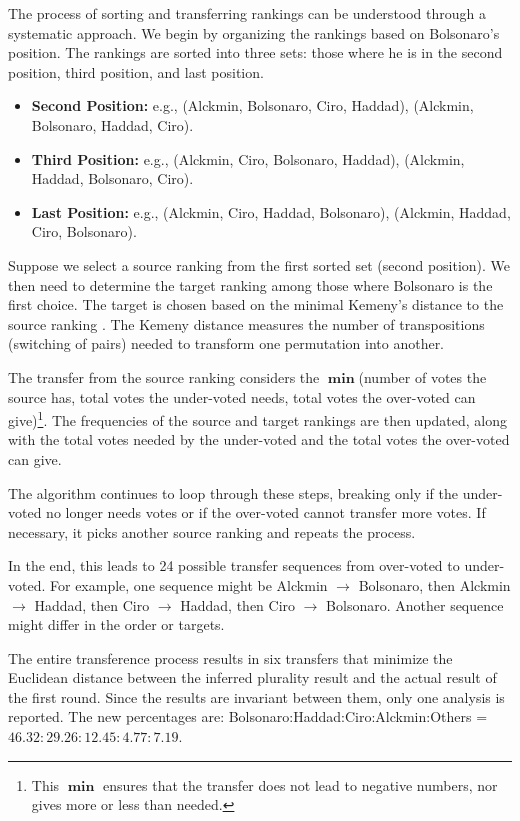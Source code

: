 \documentclass[hidelinks,11pt]{article} \usepackage[utf8]{inputenc}
\begin{document}
The process of sorting and transferring rankings can be understood through a systematic approach. We begin by organizing the rankings based on Bolsonaro's position. The rankings are sorted into three sets: those where he is in the second position, third position, and last position.

\begin{itemize}
    \item \textbf{Second Position:} e.g., (Alckmin, Bolsonaro, Ciro, Haddad), (Alckmin, Bolsonaro, Haddad, Ciro).
    \item \textbf{Third Position:} e.g., (Alckmin, Ciro, Bolsonaro, Haddad), (Alckmin, Haddad, Bolsonaro, Ciro).
    \item \textbf{Last Position:} e.g., (Alckmin, Ciro, Haddad, Bolsonaro), (Alckmin, Haddad, Ciro, Bolsonaro).
\end{itemize}

Suppose we select a source ranking from the first sorted set (second position). We then need to determine the target ranking among those where Bolsonaro is the first choice. The target is chosen based on the minimal Kemeny's distance to the source ranking \parencite{nurmi2002voting}. The Kemeny distance measures the number of transpositions (switching of pairs) needed to transform one permutation into another.

The transfer from the source ranking considers the \(\operatorname{\mathbf{min}}\)(number of votes the source has, total votes the under-voted needs, total votes the over-voted can give)\footnote{This \(\operatorname{\mathbf{min}}\) ensures that the transfer does not lead to negative numbers, nor gives more or less than needed.}. The frequencies of the source and target rankings are then updated, along with the total votes needed by the under-voted and the total votes the over-voted can give.

The algorithm continues to loop through these steps, breaking only if the under-voted no longer needs votes or if the over-voted cannot transfer more votes. If necessary, it picks another source ranking and repeats the process.

In the end, this leads to 24 possible transfer sequences from over-voted to under-voted. For example, one sequence might be Alckmin \(\to\) Bolsonaro, then Alckmin \(\to\) Haddad, then Ciro \(\to\) Haddad, then Ciro \(\to\) Bolsonaro. Another sequence might differ in the order or targets.

The entire transference process results in six transfers that minimize the Euclidean distance between the inferred plurality result and the actual result of the first round. Since the results are invariant between them, only one analysis is reported. The new percentages are: Bolsonaro:Haddad:Ciro:Alckmin:Others = \(46.32:29.26:12.45:4.77:7.19\).
\end{document}
